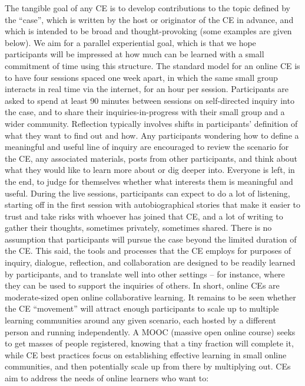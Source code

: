The tangible goal of any CE is to develop contributions to the topic
defined by the ``case'', which is written by the host or originator of
the CE in advance, and which is intended to be broad and
thought-provoking (some examples are given below). We aim for a parallel
experiential goal, which is that we hope participants will be impressed
at how much can be learned with a small commitment of time using this
structure. The standard model for an online CE is to have four sessions
spaced one week apart, in which the same small group interacts in real
time via the internet, for an hour per session. Participants are asked
to spend at least 90 minutes between sessions on self-directed inquiry
into the case, and to share their inquiries-in-progress with their small
group and a wider community. Reflection typically involves shifts in
participants' definition of what they want to find out and how. Any
participants wondering how to define a meaningful and useful line of
inquiry are encouraged to review the scenario for the CE, any associated
materials, posts from other participants, and think about what they
would like to learn more about or dig deeper into. Everyone is left, in
the end, to judge for themselves whether what interests them is
meaningful and useful. During the live sessions, participants can expect
to do a lot of listening, starting off in the first session with
autobiographical stories that make it easier to trust and take risks
with whoever has joined that CE, and a lot of writing to gather their
thoughts, sometimes privately, sometimes shared. There is no assumption
that participants will pursue the case beyond the limited duration of
the CE. This said, the tools and processes that the CE employs for
purposes of inquiry, dialogue, reflection, and collaboration are
designed to be readily learned by participants, and to translate well
into other settings -- for instance, where they can be used to support
the inquiries of others. In short, online CEs are moderate-sized open
online collaborative learning. It remains to be seen whether the CE
``movement'' will attract enough participants to scale up to multiple
learning communities around any given scenario, each hosted by a
different person and running independently. A MOOC (massive open online
course) seeks to get masses of people registered, knowing that a tiny
fraction will complete it, while CE best practices focus on establishing
effective learning in small online communities, and then potentially
scale up from there by multiplying out. CEs aim to address the needs of
online learners who want to:


